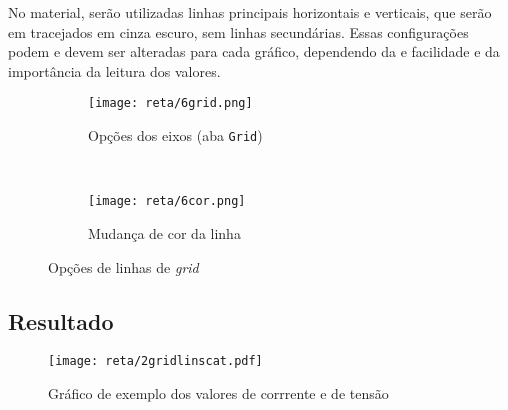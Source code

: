     No material, serão utilizadas linhas principais horizontais e verticais, que serão em tracejados em cinza escuro, sem linhas secundárias. Essas configurações podem e devem ser alteradas para cada gráfico, dependendo da e facilidade e da importância da leitura dos valores.

    \begin{figure}[htbp]
        \centering
        \begin{subfigure}{0.45\textwidth}
            \centering
            \texttt{[image: reta/6grid.png]}

            \caption{Opções dos eixos (aba \texttt{Grid})}
            \label{fig:reta:grid}
        \end{subfigure}
        ~
        \begin{subfigure}{0.45\textwidth}
            \centering
            \texttt{[image: reta/6cor.png]}

            \caption{Mudança de cor da linha}
            \label{fig:reta:gridcor}
        \end{subfigure}
        \caption{Opções de linhas de \textit{grid}}
        \label{fig:reta:opcoes_eixo}
    \end{figure}


\subsection{Resultado}

    \begin{figure}[htbp]
        \centering
        \texttt{[image: reta/2gridlinscat.pdf]}

        \caption{Gráfico de exemplo dos valores de corrrente e de tensão}
        \label{fig:reta:gridlinscat}
    \end{figure}

